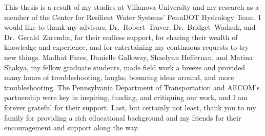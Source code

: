 %
\label{sec:acknowledgement}

This thesis is a result of my studies at Villanova University and my research as a member of the Center for Resilient Water Systems' PennDOT Hydrology Team. I would like to thank my advisors, Dr.~Robert~Traver, Dr.~Bridget~Wadzuk, and Dr.~Gerald~Zaremba, for their endless support, for sharing their wealth of knowledge and experience, and for entertaining my continuous requests to try new things. Madhat Fares, Danielle Galloway, Shaelynn Heffernan, and Matina Shakya, my fellow graduate students, made field work a breeze and provided many hours of troubleshooting, laughs, bouncing ideas around, and more troubleshooting. The Pennsylvania Department of Transportation and AECOM's partnership were key in inspiring, funding, and critiquing our work, and I am forever grateful for their support. Last, but certainly not least, thank you to my family for providing a rich educational background and my friends for their encouragement and support along the way.
